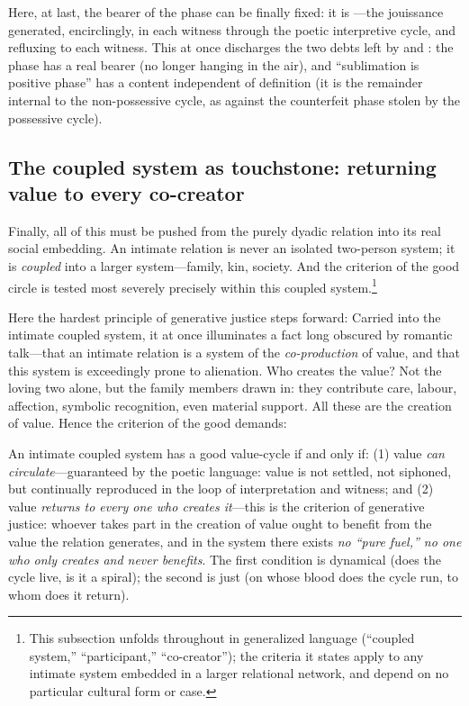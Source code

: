Here, at last, the bearer of the phase can be finally fixed: it is ---the jouissance generated, encirclingly, in each witness through the poetic interpretive cycle, and refluxing to each witness. This at once discharges the two debts left by  and : the phase has a real bearer (no longer hanging in the air), and ``sublimation is positive phase'' has a content independent of definition (it is the remainder internal to the non-possessive cycle, as against the counterfeit phase stolen by the possessive cycle).

\subsection{The coupled system as touchstone: returning value to every co-creator}
\label{p09:sec:coupled}

Finally, all of this must be pushed from the purely dyadic relation into its real social embedding. An intimate relation is never an isolated two-person system; it is \emph{coupled} into a larger system---family, kin, society. And the criterion of the good circle is tested most severely precisely within this coupled system.\footnote{This subsection unfolds throughout in generalized language (``coupled system,'' ``participant,'' ``co-creator''); the criteria it states apply to any intimate system embedded in a larger relational network, and depend on no particular cultural form or case.}

Here the hardest principle of generative justice steps forward:  Carried into the intimate coupled system, it at once illuminates a fact long obscured by romantic talk---that an intimate relation is a system of the \emph{co-production} of value, and that this system is exceedingly prone to alienation. Who creates the value? Not the loving two alone, but the family members drawn in: they contribute care, labour, affection, symbolic recognition, even material support. All these are the creation of value. Hence the criterion of the good demands:

\begin{claim}
An intimate coupled system has a good value-cycle if and only if: (1) value \emph{can circulate}---guaranteed by the poetic language: value is not settled, not siphoned, but continually reproduced in the loop of interpretation and witness; and (2) value \emph{returns to every one who creates it}---this is the criterion of generative justice: whoever takes part in the creation of value ought to benefit from the value the relation generates, and in the system there exists \emph{no ``pure fuel,'' no one who only creates and never benefits}. The first condition is dynamical (does the cycle live, is it a spiral); the second is just (on whose blood does the cycle run, to whom does it return).
\end{claim}

